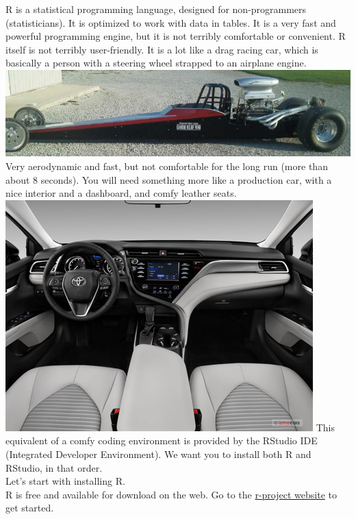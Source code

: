 \documentclass[
]{book}
\begin{document}
R is a statistical programming language, designed for non-programmers (statisticians). It is optimized to work with data in tables. It is a very fast and powerful programming engine, but it is not terribly comfortable or convenient. R itself is not terribly user-friendly. It is a lot like a drag racing car, which is basically a person with a steering wheel strapped to an airplane engine.
\includegraphics{images/drag.png}
Very aerodynamic and fast, but not comfortable for the long run (more than about 8 seconds).
You will need something more like a production car, with a nice interior and a dashboard, and comfy leather seats.
\includegraphics{images/dashboard.png}
This equivalent of a comfy coding environment is provided by the RStudio IDE (Integrated Developer Environment). We want you to install both R and RStudio, in that order.\\
Let's start with installing R.\\
R is free and available for download on the web. Go to the \href{https://r-project.org/}{r-project website} to get started.
\end{document}
